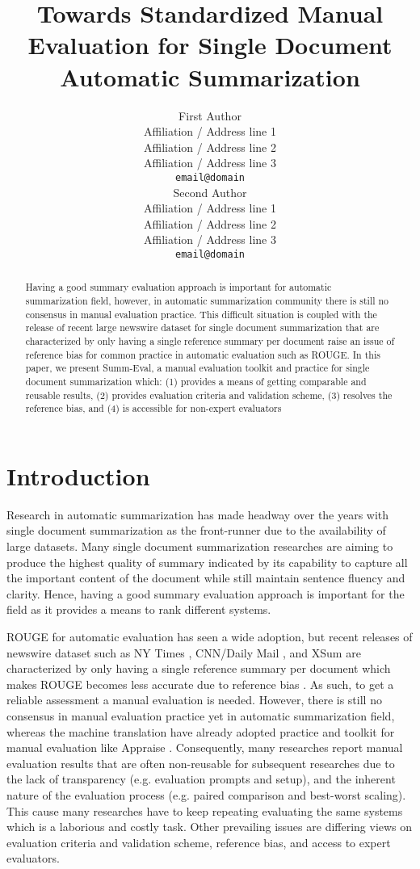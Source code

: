 \documentclass[11pt,a4paper]{article}
\title{Towards Standardized Manual Evaluation for Single Document Automatic Summarization}
\author{First Author \\
  Affiliation / Address line 1 \\
  Affiliation / Address line 2 \\
  Affiliation / Address line 3 \\
  {\tt email@domain} \\\And
  Second Author \\
  Affiliation / Address line 1 \\
  Affiliation / Address line 2 \\
  Affiliation / Address line 3 \\
  {\tt email@domain} \\}
\date{}
\begin{document}
\maketitle
\begin{abstract}
Having a good summary evaluation approach is important for automatic summarization field, however, in automatic summarization community there is still no consensus in manual evaluation practice. This difficult situation is coupled with the release of recent large newswire dataset for single document summarization that are characterized by only having a single reference summary per document raise an issue of reference bias for common practice in automatic evaluation such as ROUGE. In this paper, we present Summ-Eval, a manual evaluation toolkit and practice for single document summarization which: (1) provides a means of getting comparable and reusable results, (2) provides evaluation criteria and validation scheme, (3) resolves the reference bias, and (4) is accessible for non-expert evaluators 
\end{abstract}
\section{Introduction}

Research in automatic summarization has made headway over the years with single document summarization as the front-runner due to the availability of large datasets. Many single document summarization researches \citep{See2017, Kryscinski2018, Shashi2018} are aiming to produce the highest quality of summary indicated by its capability to capture all the important content of the document while still maintain sentence fluency and clarity. Hence, having a good summary evaluation approach is important for the field as it provides a means to rank different systems.  

ROUGE \citep{Lin2004} for automatic evaluation has seen a wide adoption, but recent releases of newswire dataset such as NY Times \citep{Sandhaus2008}, CNN/Daily Mail \citep{Hermann2015}, and XSum \citep{Shashi2018} are characterized by only having a single reference summary per document which makes ROUGE becomes less accurate due to reference bias \citep{Louis2013}. As such, to get a reliable assessment a manual evaluation is needed. However, there is still no consensus in manual evaluation practice yet in automatic summarization field, whereas the machine translation have already adopted practice and toolkit for manual evaluation like Appraise \citep{Federmann2012}. Consequently, many researches report manual evaluation results that are often non-reusable for subsequent researches due to the lack of transparency (e.g. evaluation prompts and setup), and the inherent nature of the evaluation process (e.g. paired comparison and best-worst scaling). This cause many researches have to keep repeating evaluating the same systems which is a laborious and costly task. Other prevailing issues are differing views on evaluation criteria and validation scheme, reference bias, and access to expert evaluators. 
\end{document}
